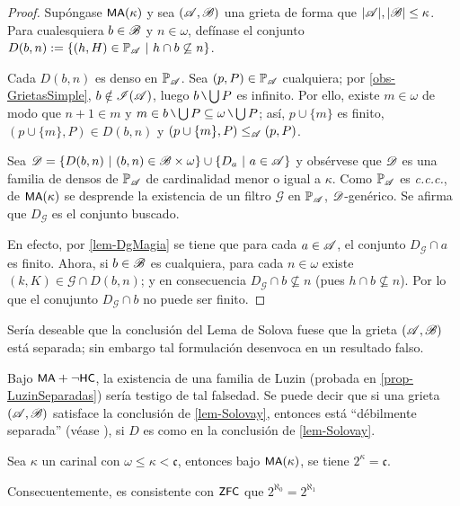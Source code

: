 	\begin{proof}
		Supóngase $\text{\textsf{\small MA}}(\kappa)$ y sea $(\mathscr{A},\mathscr{B})$ una grieta de forma que $|\mathscr{A}|,|\mathscr{B}|\leq \kappa$. Para cualesquiera $b \in \mathscr{B}$ y $n \in \omega$, defínase el conjunto $D(b,n):=\{ (h,H) \in \mathbb{P}_{\mathscr{A}} \text{ $|$ } h \cap b \not\subseteq n \}$.

		Cada $D(b,n)$ es denso en $\mathbb{P}_{\mathscr{A}}$. Sea $(p,P) \in \mathbb{P}_{\mathscr{A}}$ cualquiera; por \ref{obs-GrietasSimple}, $b \notin \mathscr{I}(\mathscr{A}) $, luego $b \setminus \midcup P$ es infinito. Por ello, existe $m \in \omega$ de modo que $n+1 \in m$ y $m \in b \setminus \midcup P \subseteq \omega \setminus \midcup P$; así, $p \cup \{m\}$ es finito, $(p \cup \{m\}, P) \in D(b,n)$ y $(p \cup \{m\}, P) \leq_{\mathscr{A}} (p,P)$.

		Sea $\mathscr{D}=\{ D(b,n) \text{ $|$ } (b,n) \in \mathscr{B} \times \omega \} \cup \{D_a \text{ $|$ } a \in \mathscr{A} \}$ y obsérvese que $\mathscr{D}$ es una familia de densos de $\mathbb{P}_{\mathscr{A}}$ de cardinalidad menor o igual a $\kappa$. Como $\mathbb{P}_{\mathscr{A}}$ es \textit{c.c.c.}, de $\text{\textsf{\small MA}}(\kappa)$ se desprende la existencia de un filtro $\mathcal{G}$ en $\mathbb{P}_{\mathscr{A}}$, $\mathscr{D}$-genérico. Se afirma que $D_\mathcal{G}$ es el conjunto buscado.

		En efecto, por \ref{lem-DgMagia} se tiene que para cada $a \in \mathscr{A}$, el conjunto $D_\mathcal{G} \cap a$ es finito. Ahora, si $b \in \mathscr{B}$ es cualquiera, para cada $n \in \omega$ existe $(k,K) \in \mathcal{G} \cap D(b,n)$; y en consecuencia $D_\mathcal{G} \cap b \not \subseteq n$ (pues $h \cap b \not \subseteq n$). Por lo que el conujunto $D_\mathcal{G} \cap b$ no puede ser finito. 
	\end{proof}

	Sería deseable que la conclusión del Lema de Solova fuese que la grieta $(\mathscr{A},\mathscr{B})$ está separada; sin embargo tal formulación desenvoca en un resultado falso.
	
	Bajo $\text{\textsf{\small MA}} + \lnot\text{\textsf{\small HC}}$, la existencia de una familia de Luzin (probada en \ref{prop-LuzinSeparadas}) sería testigo de tal falsedad. Se puede decir que si una grieta $(\mathscr{A},\mathscr{B})$ satisface la conclusión de \ref{lem-Solovay}, entonces está ``débilmente separada'' (véase \cite[\S~ 3.2]{hruAlmost}), si $D$ es como en la conclusión de \ref{lem-Solovay}.


	\begin{corolario}
		Sea $\kappa$ un carinal con $\omega \leq \kappa <\mathfrak{c}$, entonces bajo $\text{\textsf{\small MA}}(\kappa)$, se tiene $2^\kappa=\mathfrak{c}$.

		Consecuentemente, es consistente con $\text{\textsf{\small ZFC}}$ que $2^{\aleph_0}=2^{\aleph_1}$
	\end{corolario}

